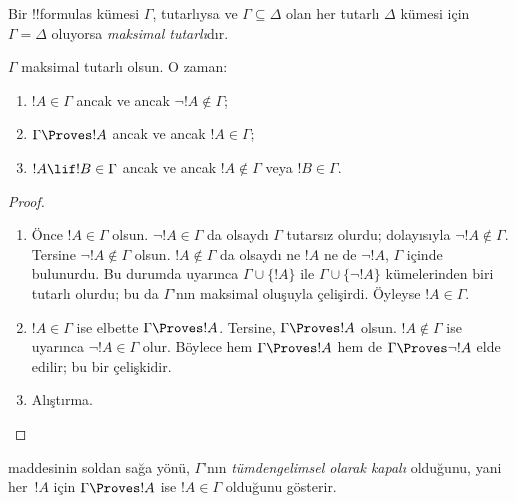 



\begin{defn}
Bir !!{formula}s kümesi $\Gamma$, tutarlıysa ve $\Gamma \subseteq \Delta$
olan her tutarlı $\Delta$ kümesi için $\Gamma = \Delta$ oluyorsa
\emph{maksimal tutarlı}dır.
\end{defn}

\begin{lem}
$\Gamma$ maksimal tutarlı olsun. O zaman:
\begin{enumerate}
\item {} $!A \in \Gamma$ ancak ve ancak $\lnot !A
  \notin \Gamma$;
\item {} $\Gamma \Proves !A$ ancak ve ancak $!A \in \Gamma$;
\item {} $!A \lif !B \in \Gamma$ ancak ve ancak
  $!A \notin \Gamma$ veya $!B \in \Gamma$.
\end{enumerate}
\end{lem}

\begin{proof}
\begin{enumerate}
\item Önce $!A \in \Gamma$ olsun. $\lnot !A \in \Gamma$ da olsaydı
  $\Gamma$ tutarsız olurdu; dolayısıyla $\lnot !A \notin \Gamma$.
  Tersine $\lnot !A \notin \Gamma$ olsun. $!A \notin \Gamma$ da olsaydı
  ne $!A$ ne de $\lnot !A$, $\Gamma$ içinde bulunurdu. Bu durumda
   uyarınca $\Gamma\cup\{!A\}$ ile
  $\Gamma \cup \{\lnot !A\}$ kümelerinden biri tutarlı olurdu; bu da
  $\Gamma$'nın maksimal oluşuyla çelişirdi. Öyleyse $!A \in \Gamma$.
\item $!A \in \Gamma$ ise elbette $\Gamma \Proves !A$. Tersine,
  $\Gamma \Proves !A$ olsun. $!A \notin \Gamma$ ise
   uyarınca $\lnot !A \in \Gamma$ olur. Böylece hem
  $\Gamma \Proves !A$ hem de $\Gamma \Proves \lnot !A$ elde edilir; bu
  bir çelişkidir.
\item Alıştırma.
\end{enumerate}
\end{proof}

 maddesinin soldan sağa yönü,
$\Gamma$'nın \emph{tümdengelimsel olarak kapalı} olduğunu, yani her~$!A$
için $\Gamma \Proves !A$ ise $!A \in \Gamma$ olduğunu gösterir.

